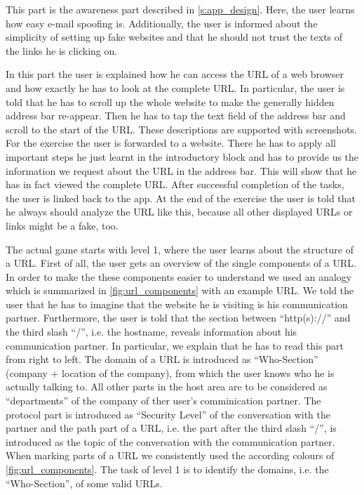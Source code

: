 \begin{description}[leftmargin=0cm]
	\item[Introduction 1] This part is the awareness part described in \autoref{s:app_design}. Here, the user learns how easy e-mail spoofing is.
 Additionally, the user is informed about the simplicity of setting up fake websites and that he should not trust the texts of the links he is clicking on.

	\item[Introduction 2] In this part the user is explained how he can access the URL of a web browser and how exactly he has to look at the complete URL.
 In particular, the user is told that he has to scroll up the whole website to make the generally hidden address bar re-appear.
 Then he has to tap the text field of the address bar and scroll to the start of the URL.
These descriptions are supported with screenshots.
For the exercise the user is forwarded to a website.
There he has to apply all important steps he just learnt in the introductory block and has to provide us the information we request about the URL in the address bar.
 This will show that he has in fact viewed the complete URL.
After successful completion of the tasks, the user is linked back to the app.
 At the end of the exercise the user is told that he always should analyze the URL like this, because all other displayed URLs or links might be a fake, too.

	\item[Level 1] The actual game starts with level 1, where the user learns about the structure of a URL.
 First of all, the user gets an overview of the single components of a URL.
 In order to make the these components easier to understand we used an analogy which is summarized in \autoref{fig:url_components} with an example URL.
 We told the user that he has to imagine that the website he is visiting is his communication partner.
 Furthermore, the user is told that the section between ``http(s)://'' and the third slash ``/'', i.e. the hostname, reveals information about his communication partner.
 In particular, we explain that he has to read this part from right to left.
 The domain of a URL is introduced as ``Who-Section'' (company + location of the company), from which the user knows who he is actually talking to.
 All other parts in the host area are to be considered as ``departments'' of the company of ther user's comminication partner.
 The protocol part is introduced as ``Security Level'' of the conversation with the partner and the path part of a URL, i.e. the part after the third slash ``/'', is introduced as the topic of the conversation with the communication partner.
 When marking parts of a URL we consistently used the according colours of \autoref{fig:url_components}. 
The task of level 1 is to identify the domains, i.e. the ``Who-Section'', of some valid URLs.


\end{description}
